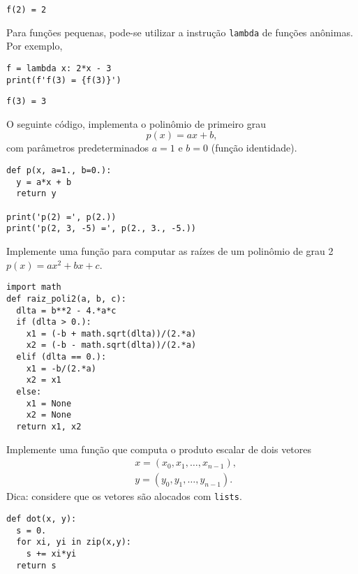 \begin{verbatim}
f(2) = 2
\end{verbatim}

\begin{obs}
  Para funções pequenas, pode-se utilizar a instrução \texttt{lambda} de funções anônimas. Por exemplo,

\begin{lstlisting}
f = lambda x: 2*x - 3
print(f'f(3) = {f(3)}')
\end{lstlisting}

\begin{verbatim}
f(3) = 3
\end{verbatim}

\end{obs}

\begin{ex}
  O seguinte código, implementa o polinômio de primeiro grau
  \begin{equation}
    p(x) = ax + b,
  \end{equation}
  com parâmetros predeterminados $a=1$ e $b=0$ (função identidade).

\begin{lstlisting}
def p(x, a=1., b=0.):
  y = a*x + b
  return y

print('p(2) =', p(2.))
print('p(2, 3, -5) =', p(2., 3., -5.))
\end{lstlisting}

\end{ex}

\begin{exer}
  Implemente uma função para computar as raízes de um polinômio de grau 2 $p(x) = ax^2 + bx + c$.
\end{exer}
\begin{resp}

\begin{lstlisting}
import math
def raiz_poli2(a, b, c):
  dlta = b**2 - 4.*a*c
  if (dlta > 0.):
    x1 = (-b + math.sqrt(dlta))/(2.*a)
    x2 = (-b - math.sqrt(dlta))/(2.*a)
  elif (dlta == 0.):
    x1 = -b/(2.*a)
    x2 = x1
  else:
    x1 = None
    x2 = None
  return x1, x2  
\end{lstlisting}

\end{resp}

\begin{exer}
  Implemente uma função que computa o produto escalar de dois vetores
  \begin{align}
    &x = (x_0, x_1, \ldots, x_{n-1}),\\
    &y = (y_0, y_1, \ldots, y_{n-1}).
  \end{align}
  Dica: considere que os vetores são alocados com \texttt{lists}.
\end{exer}
\begin{resp}
  
\begin{lstlisting}
def dot(x, y):
  s = 0.
  for xi, yi in zip(x,y):
    s += xi*yi
  return s
\end{lstlisting}

\end{resp}

